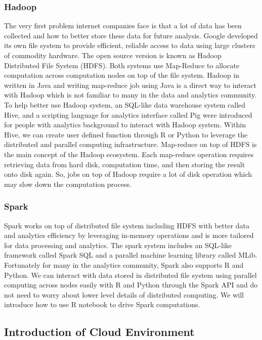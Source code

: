 \documentclass[
]{article}
\begin{document}
\hypertarget{hadoop}{%
\subsubsection{Hadoop}\label{hadoop}}

The very first problem internet companies face is that a lot of data has
been collected and how to better store these data for future analysis.
Google developed its own file system to provide efficient, reliable
access to data using large clusters of commodity hardware. The open
source version is known as Hadoop Distributed File System (HDFS). Both
systems use Map-Reduce to allocate computation across computation nodes
on top of the file system. Hadoop in written in Java and writing
map-reduce job using Java is a direct way to interact with Hadoop which
is not familiar to many in the data and analytics community. To help
better use Hadoop system, an SQL-like data warehouse system called Hive,
and a scripting language for analytics interface called Pig were
introduced for people with analytics background to interact with Hadoop
system. Within Hive, we can create user defined function through R or
Python to leverage the distributed and parallel computing
infrastructure. Map-reduce on top of HDFS is the main concept of the
Hadoop ecosystem. Each map-reduce operation requires retrieving data
from hard disk, computation time, and then storing the result onto disk
again. So, jobs on top of Hadoop require a lot of disk operation which
may slow down the computation process.

\hypertarget{spark}{%
\subsubsection{Spark}\label{spark}}

Spark works on top of distributed file system including HDFS with better
data and analytics efficiency by leveraging in-memory operations and is
more tailored for data processing and analytics. The spark system
includes an SQL-like framework called Spark SQL and a parallel machine
learning library called MLib. Fortunately for many in the analytics
community, Spark also supports R and Python. We can interact with data
stored in distributed file system using parallel computing across nodes
easily with R and Python through the Spark API and do not need to worry
about lower level details of distributed computing. We will introduce
how to use R notebook to drive Spark computations.

\hypertarget{introduction-of-cloud-environment}{%
\subsection{Introduction of Cloud
Environment}\label{introduction-of-cloud-environment}}
\end{document}
